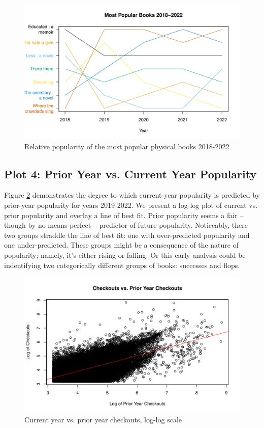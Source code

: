 \documentclass[10pt]{article}\usepackage[]{graphicx}\usepackage[]{color}
\makeatletter
\def\maxwidth{ %
  \ifdim\Gin@nat@width>\linewidth
    \linewidth
  \else
    \Gin@nat@width
  \fi
}
\newenvironment{knitrout}{}{} %
\makeatother
\begin{document}
\begin{figure}[H]
\begin{center}
\begin{knitrout}
\color{fgcolor}
\includegraphics[width=\maxwidth]{figure/plot3-1} 
\end{knitrout}
\end{center}
\caption{Relative popularity of the most popular physical books 2018-2022}\label{fig:3}
\end{figure}

\subsection{Plot 4: Prior Year vs. Current Year Popularity}

Figure \ref{fig:4} demonstrates the degree to which current-year popularity is predicted by prior-year popularity for years 
2019-2022. We present a log-log plot of current vs. prior popularity and overlay a line of best fit. 
Prior popularity seems a fair -- though by no means perfect -- predictor of future popularity. Noticeably, there two groups 
straddle the line of best fit: one with over-predicted popularity and one under-predicted. These groups might be a 
consequence of the nature of popularity; namely, it's either rising or falling. Or this early analysis could be indentifying
two categorically different groups of books: successes and flops. 

\begin{figure}[H]
\begin{center}
\begin{knitrout}
\color{fgcolor}
\includegraphics[width=\maxwidth]{figure/plot4-1} 
\end{knitrout}
\end{center}
\caption{Current year vs. prior year checkouts, log-log scale}\label{fig:4}
\end{figure}
\end{document}
